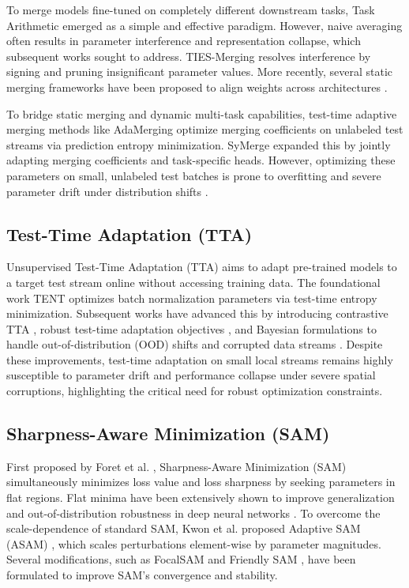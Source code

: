 \documentclass{article}
\theoremstyle{plain}
\theoremstyle{definition}
\theoremstyle{remark}
\begin{document}
To merge models fine-tuned on completely different downstream tasks, Task Arithmetic \cite{ilharco2022editing_1} emerged as a simple and effective paradigm. However, naive averaging often results in parameter interference and representation collapse, which subsequent works sought to address. TIES-Merging \cite{yadav2023ties} resolves interference by signing and pruning insignificant parameter values. More recently, several static merging frameworks have been proposed to align weights across architectures \cite{amine2019merging, saadati2024dimat, slimi2024a, khan2024sok, zeng2025robustmerge, zeng2025parameter}. 

To bridge static merging and dynamic multi-task capabilities, test-time adaptive merging methods like AdaMerging \cite{yang2024adamerging} optimize merging coefficients on unlabeled test streams via prediction entropy minimization. SyMerge \cite{jung2025symerge} expanded this by jointly adapting merging coefficients and task-specific heads. However, optimizing these parameters on small, unlabeled test batches is prone to overfitting and severe parameter drift under distribution shifts \cite{huang2025drift}.

\subsection{Test-Time Adaptation (TTA)}
Unsupervised Test-Time Adaptation (TTA) aims to adapt pre-trained models to a target test stream online without accessing training data. The foundational work TENT \cite{wang2021tent} optimizes batch normalization parameters via test-time entropy minimization. Subsequent works have advanced this by introducing contrastive TTA \cite{chen2022contrastive}, robust test-time adaptation objectives \cite{niu2023towards}, and Bayesian formulations \cite{zhou2025bayesian} to handle out-of-distribution (OOD) shifts and corrupted data streams \cite{karmanov2024efficient, yuan2023robust, lee2024entropy, xu2024adaptive, liu2025unsupervised, gao2024unsupervised}. Despite these improvements, test-time adaptation on small local streams remains highly susceptible to parameter drift and performance collapse under severe spatial corruptions, highlighting the critical need for robust optimization constraints.

\subsection{Sharpness-Aware Minimization (SAM)}
First proposed by Foret et al. \cite{foret2020sharpnessaware}, Sharpness-Aware Minimization (SAM) simultaneously minimizes loss value and loss sharpness by seeking parameters in flat regions. Flat minima have been extensively shown to improve generalization and out-of-distribution robustness in deep neural networks \cite{andriushchenko2022towards, fan2025towards, luo2025explicit, zhu2023enhancing}. To overcome the scale-dependence of standard SAM, Kwon et al. proposed Adaptive SAM (ASAM) \cite{kwon2021asam_1}, which scales perturbations element-wise by parameter magnitudes. Several modifications, such as FocalSAM \cite{li2025focalsam} and Friendly SAM \cite{li2024friendly}, have been formulated to improve SAM's convergence and stability. 
\end{document}
